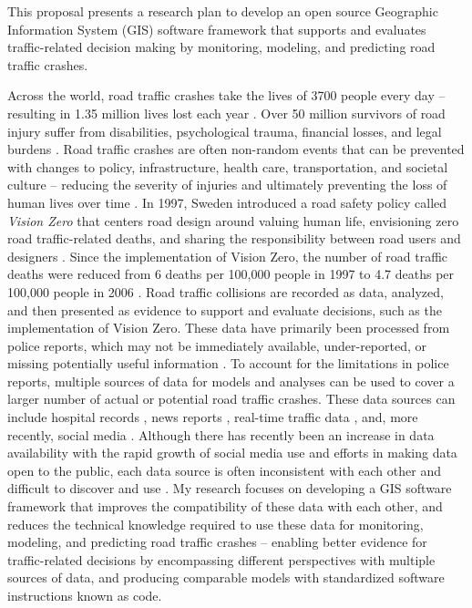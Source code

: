 
This proposal presents a research plan to develop an open source Geographic Information System (GIS) software framework that supports and evaluates traffic-related decision making by monitoring, modeling, and predicting road traffic crashes. 

Across the world, road traffic crashes take the lives of 3700 people every day -- resulting in 1.35 million lives lost each year \cite{who2018roadsafetyreport}. Over 50 million survivors of road injury suffer from disabilities, psychological trauma, financial losses, and legal burdens \cite{who2016postcrashresponse}. Road traffic crashes are often non-random events that can be prevented with changes to policy, infrastructure, health care, transportation, and societal culture -- reducing the severity of injuries and ultimately preventing the loss of human lives over time \cite{bonilla2014injuriesnotaccidents,brubacher2014reduceroadtraumalaw,who2017savelives}. In 1997, Sweden introduced a road safety policy called \textit{Vision Zero} that centers road design around valuing human life, envisioning zero road traffic-related deaths, and sharing the responsibility between road users and designers \cite{belin2012visionzero}. Since the implementation of Vision Zero, the number of road traffic deaths were reduced from 6 deaths per 100,000 people in 1997 to 4.7 deaths per 100,000 people in 2006 \cite{johansson2009visionzero}. Road traffic collisions are recorded as data, analyzed, and then presented as evidence to support and evaluate decisions, such as the implementation of Vision Zero. These data have primarily been processed from police reports, which may not be immediately available, under-reported, or missing potentially useful information \cite{alsop2001underreportnz,loo2007reportroadcrash}. To account for the limitations in police reports, multiple sources of data for models and analyses can be used to cover a larger number of actual or potential road traffic crashes. These data sources can include hospital records \cite{cryer2001biashospitalpolicereports}, news reports \cite{dandona2004trafficdeathssurveillance}, real-time traffic data \cite{roshandel2015realtimecrashreview}, and, more recently, social media \cite{wanichayapong2011socialtrafficdata}. Although there has recently been an increase in data availability with the rapid growth of social media use \cite{perrin2015socialmediause} and efforts in making data open to the public, each data source is often inconsistent with each other and difficult to discover and use \cite{janssen2012opendata}. My research focuses on developing a GIS software framework that improves the compatibility of these data with each other, and reduces the technical knowledge required to use these data for monitoring, modeling, and predicting road traffic crashes -- enabling better evidence for traffic-related decisions by encompassing different perspectives with multiple sources of data, and producing comparable models with standardized software instructions known as code.

